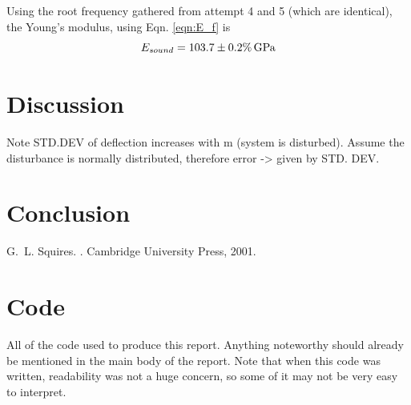 \documentclass[11pt,a4paper]{article}
\begin{document}
    Using the root frequency gathered from attempt 4 and 5 (which are identical), the Young's modulus, using Eqn. \ref{eqn:E_f} is
    \begin{equation}
      E_{sound} = 103.7 \pm 0.2 \% \,\textup{G}\textup{Pa}
    \end{equation}


\newpage
\section{\label{sect:discussion}Discussion}

Note STD.DEV of deflection increases with m (system is disturbed). Assume the disturbance is normally distributed, therefore error -> given by STD. DEV.
 
\section{\label{sect:conclusion}Conclusion}




\begin{thebibliography}{1}

G.~L. Squires.
.
\newblock Cambridge University Press, 2001.

\end{thebibliography}

\appendix*
\section{Code}
All of the code used to produce this report. Anything noteworthy should already be mentioned in the main body of the report. Note that when this code was written, readability was not a huge concern, so some of it may not be very easy to interpret. 



\end{document}
